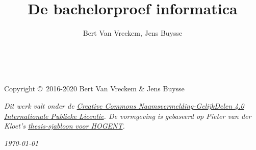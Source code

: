 \documentclass[dutch,fbo,report]{hogentreport}
\author{Bert {Van Vreckem}, Jens Buysse}
\title[Een praktische gids]{De bachelorproef informatica}
\begin{document}

\maketitle


\newpage
~\vfill
\thispagestyle{empty}

\noindent Copyright \copyright\ 2016-2020 Bert Van Vreckem \& Jens Buysse %

\noindent \textit{Dit werk valt onder de \href{http://creativecommons.org/licenses/by-sa/4.0/}{Creative Commons Naamsvermelding-GelijkDelen 4.0 Internationale Publieke Licentie}. De vormgeving is gebaseerd op Pieter van der Kloet's \href{https://github.com/pvdk/hogent-latex-thesis}{thesis-sjabloon voor HOGENT}.}

\noindent \textit{\today} %

\vspace{3cm}


\tableofcontents %












\printbibliography[notkeyword=voorbeeld]
\end{document}
